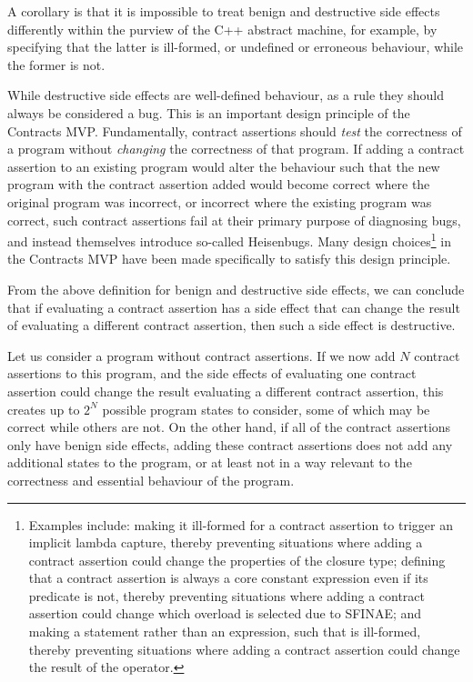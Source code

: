 A corollary is that it is impossible to treat benign and destructive side effects differently within the purview of the C++ abstract machine, for example, by specifying that the latter is ill-formed, or undefined or erroneous behaviour, while the former is not.

While destructive side effects are well-defined behaviour, as a rule they should always be considered a bug. This is an important design principle of the Contracts MVP. Fundamentally, contract assertions should \emph{test} the correctness of a program without \emph{changing} the correctness of that program. If adding a contract assertion to an existing program would alter the behaviour such that the new program with the contract assertion added would become correct where the original program was incorrect, or incorrect where the existing program was correct, such contract assertions fail at their primary purpose of diagnosing bugs, and instead themselves introduce so-called Heisenbugs. Many design choices\footnote{Examples include: making it ill-formed for a contract assertion to trigger an implicit lambda capture, thereby preventing situations where adding a contract assertion could change the properties of the closure type; defining that a contract assertion is always a core constant expression even if its predicate is not, thereby preventing situations where adding a contract assertion could change which overload is selected due to SFINAE; and making  a statement rather than an expression, such that  is ill-formed, thereby preventing situations where adding a contract assertion could change the result of the  operator.} in the Contracts MVP have been made specifically to satisfy this design principle.

From the above definition for benign and destructive side effects, we can conclude that if evaluating a contract assertion has a side effect that can change the result of evaluating a different contract assertion, then such a side effect is destructive.

Let us consider a program without contract assertions. If we now add $N$ contract assertions to this program, and the side effects of evaluating one contract assertion could change the result evaluating a different contract assertion, this creates up to $2^N$ possible program states to consider, some of which may be correct while others are not. On the other hand, if all of the contract assertions only have benign side effects, adding these contract assertions does not add any additional states to the program, or at least not in a way relevant to the correctness and essential behaviour of the program.

